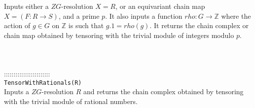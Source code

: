 \documentclass[a4paper,11pt]{report}
\begin{document}
{ Inputs either a $ZG$-resolution $X=R$, or an equivariant chain map $X = (F:R \longrightarrow S)$, and a prime $p$. It also inputs a function $rho\colon G\rightarrow \mathbb Z$ where the action of $g \in G$ on $\mathbb Z$ is such that $g.1 = rho(g)$. It returns the chain complex or chain map obtained by tensoring with the
trivial module of integers modulo $p$. \\
 \\
 \\
 \\
 ::::::::::::::::::::::::\\
 \texttt{TensorWithRationals(R)}\\
 

 Inputs a $ZG$-resolution $R$ and returns the chain complex obtained by tensoring with the trivial module of
rational numbers. \\
 \\
 \\
 }

 
\end{document}
